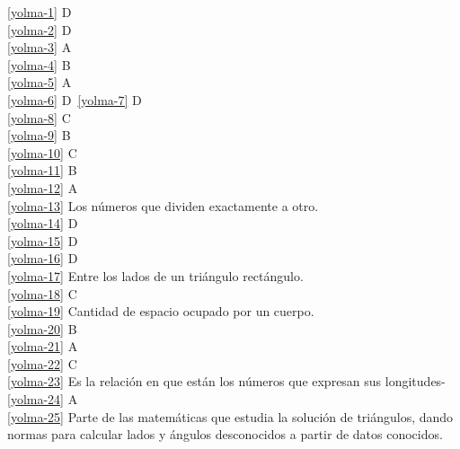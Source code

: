 
\noindent \ref{yolma-1} D\\
\ref{yolma-2} D\\
\ref{yolma-3} A\\
\ref{yolma-4} B\\
\ref{yolma-5} A\\
\ref{yolma-6} D\
\ref{yolma-7} D\\
\ref{yolma-8} C\\
\ref{yolma-9} B\\
\ref{yolma-10} C\\
\ref{yolma-11} B\\
\ref{yolma-12} A\\
\ref{yolma-13} Los números que dividen exactamente a otro.\\
\ref{yolma-14} D\\
\ref{yolma-15} D\\
\ref{yolma-16} D\\
\ref{yolma-17} Entre los lados de un triángulo rectángulo.\\
\ref{yolma-18} C\\
\ref{yolma-19} Cantidad de espacio ocupado por un cuerpo.\\
\ref{yolma-20} B\\
\ref{yolma-21} A\\
\ref{yolma-22} C\\
\ref{yolma-23} Es la relación en que están los números que expresan sus longitudes-\\
\ref{yolma-24} A\\
\ref{yolma-25} Parte de las matemáticas que estudia la solución de triángulos, dando normas para calcular lados y ángulos desconocidos a partir de datos conocidos.\\


